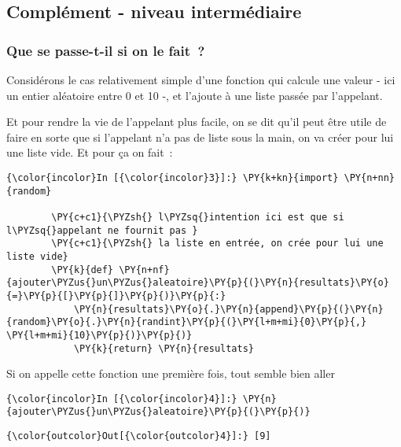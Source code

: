     \hypertarget{compluxe9ment---niveau-intermuxe9diaire}{%
\subsection{Complément - niveau
intermédiaire}\label{compluxe9ment---niveau-intermuxe9diaire}}

    \hypertarget{que-se-passe-t-il-si-on-le-fait}{%
\subsubsection{Que se passe-t-il si on le
fait~?}\label{que-se-passe-t-il-si-on-le-fait}}

    Considérons le cas relativement simple d'une fonction qui calcule une
valeur - ici un entier aléatoire entre 0 et 10 -, et l'ajoute à une
liste passée par l'appelant.

    Et pour rendre la vie de l'appelant plus facile, on se dit qu'il peut
être utile de faire en sorte que si l'appelant n'a pas de liste sous la
main, on va créer pour lui une liste vide. Et pour ça on fait~:

    \begin{Verbatim}[commandchars=\\\{\},frame=single,framerule=0.3mm,rulecolor=\color{cellframecolor}]
{\color{incolor}In [{\color{incolor}3}]:} \PY{k+kn}{import} \PY{n+nn}{random}
        
        \PY{c+c1}{\PYZsh{} l\PYZsq{}intention ici est que si l\PYZsq{}appelant ne fournit pas }
        \PY{c+c1}{\PYZsh{} la liste en entrée, on crée pour lui une liste vide}
        \PY{k}{def} \PY{n+nf}{ajouter\PYZus{}un\PYZus{}aleatoire}\PY{p}{(}\PY{n}{resultats}\PY{o}{=}\PY{p}{[}\PY{p}{]}\PY{p}{)}\PY{p}{:}
            \PY{n}{resultats}\PY{o}{.}\PY{n}{append}\PY{p}{(}\PY{n}{random}\PY{o}{.}\PY{n}{randint}\PY{p}{(}\PY{l+m+mi}{0}\PY{p}{,} \PY{l+m+mi}{10}\PY{p}{)}\PY{p}{)}
            \PY{k}{return} \PY{n}{resultats}
\end{Verbatim}


    Si on appelle cette fonction une première fois, tout semble bien aller

    \begin{Verbatim}[commandchars=\\\{\},frame=single,framerule=0.3mm,rulecolor=\color{cellframecolor}]
{\color{incolor}In [{\color{incolor}4}]:} \PY{n}{ajouter\PYZus{}un\PYZus{}aleatoire}\PY{p}{(}\PY{p}{)}
\end{Verbatim}


\begin{Verbatim}[commandchars=\\\{\},frame=single,framerule=0.3mm,rulecolor=\color{cellframecolor}]
{\color{outcolor}Out[{\color{outcolor}4}]:} [9]
\end{Verbatim}
            
